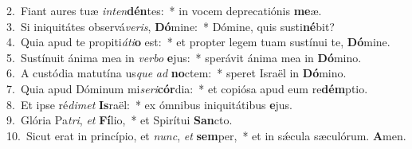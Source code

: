 {2.~}Fiant aures tuæ \textit{in}\textit{ten}\textbf{dén}tes:~* in vocem deprecatiónis \textbf{me}æ.\\
{3.~}Si iniquitátes observá\textit{ve}\textit{ris}, \textbf{Dó}mine:~* Dómine, quis susti\textbf{né}bit?\\
{4.~}Quia apud te propiti\textit{á}\textit{ti}\textbf{o} est:~* et propter legem tuam sustínui te, \textbf{Dó}mine.\\
{5.~}Sustínuit ánima mea in \textit{ver}\textit{bo} \textbf{e}jus:~* sperávit ánima mea in \textbf{Dó}mino.\\
{6.~}A custódia matutína us\textit{que} \textit{ad} \textbf{no}ctem:~* speret Israël in \textbf{Dó}mino.\\
{7.~}Quia apud Dóminum mi\textit{se}\textit{ri}\textbf{cór}dia:~* et copiósa apud eum re\textbf{dém}ptio.\\
{8.~}Et ipse ré\textit{di}\textit{met} \textbf{Is}raël:~* ex ómnibus iniquitátibus \textbf{e}jus.\\
{9.~}Glória Pa\textit{tri}, \textit{et} \textbf{Fí}lio,~* et Spirítui \textbf{San}cto.\\
{10.~}Sicut erat in princípio, et \textit{nunc}, \textit{et} \textbf{sem}per,~* et in sǽcula sæculórum. \textbf{A}men.\\

